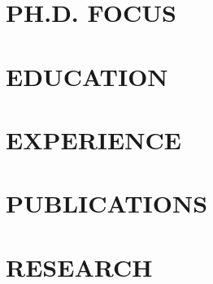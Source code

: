\documentclass[margin]{res}
\begin{document}

\address{ 306 J St \#53 \\ Davis, CA, 95616 \\ +1 (775) 846-5712 \\ stuart@cs.ucdavis.edu }


\begin{resume}

\section{PH.D. FOCUS}   
\section{EDUCATION}     
\section{EXPERIENCE}    
\section{PUBLICATIONS}  
\section{RESEARCH}      

\end{resume}
\end{document}
